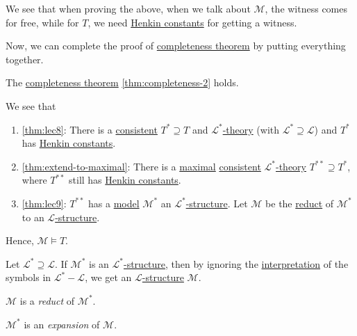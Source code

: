 \begin{remark}
	We see that when proving the above, when we talk about \(\mathcal{M} \), the witness comes for free, while for \(T\), we need \hyperref[def:Henkin-constant]{Henkin constants} for getting a witness.
\end{remark}

Now, we can complete the proof of \hyperref[thm:completeness]{completeness theorem} by putting everything together.

\begin{claim}
	The \hyperref[thm:completeness]{completeness theorem} \autoref{thm:completeness-2} holds.
\end{claim}
\begin{explanation}
	We see that
	\begin{enumerate}
		\item \autoref{thm:lec8}: There is a \hyperref[def:consistent]{consistent} \(T^{\ast} \supseteq T\) and \hyperref[def:theory]{\(\mathcal{L} ^{\ast} \)-theory} (with \(\mathcal{L} ^{\ast} \supseteq \mathcal{L} \)) and \(T^{\ast} \) has \hyperref[def:Henkin-constant]{Henkin constants}.
		\item \autoref{thm:extend-to-maximal}: There is a \hyperref[def:maximal]{maximal} \hyperref[def:consistent]{consistent} \hyperref[def:theory]{\(\mathcal{L} ^{\ast} \)-theory} \(T^{\ast\ast } \supseteq T^{\ast} \), where \(T^{\ast\ast} \) still has \hyperref[def:Henkin-constant]{Henkin constants}.
		\item \autoref{thm:lec9}: \(T^{\ast\ast }\) has a \hyperref[def:model]{model} \(\mathcal{M} ^{\ast} \) an \hyperref[def:structure]{\(\mathcal{L} ^{\ast} \)-structure}. Let \(\mathcal{M} \) be the \hyperref[not:reduct]{reduct} of \(\mathcal{M} ^{\ast} \) to an \hyperref[def:structure]{\(\mathcal{L}\)-structure}.
	\end{enumerate}
	Hence, \(\mathcal{M} \models T\).
\end{explanation}

\begin{prev}
	Let \(\mathcal{L} ^{\ast} \supseteq \mathcal{L} \). If \(\mathcal{M} ^{\ast} \) is an \hyperref[def:structure]{\(\mathcal{L} ^{\ast} \)-structure}, then by ignoring the \hyperref[not:interpretation]{interpretation} of the symbols in \(\mathcal{L} ^{\ast} - \mathcal{L} \), we get an \hyperref[def:structure]{\(\mathcal{L} \)-structure} \(\mathcal{M} \).

	\begin{notation}[Reduct]\label{not:reduct}
		\(\mathcal{M} \) is a \emph{reduct} of \(\mathcal{M} ^{\ast} \).
	\end{notation}

	\begin{notation}[Expansion]\label{not:expansion}
		\(\mathcal{M} ^{\ast} \) is an \emph{expansion} of \(\mathcal{M} \).
	\end{notation}
\end{prev}

